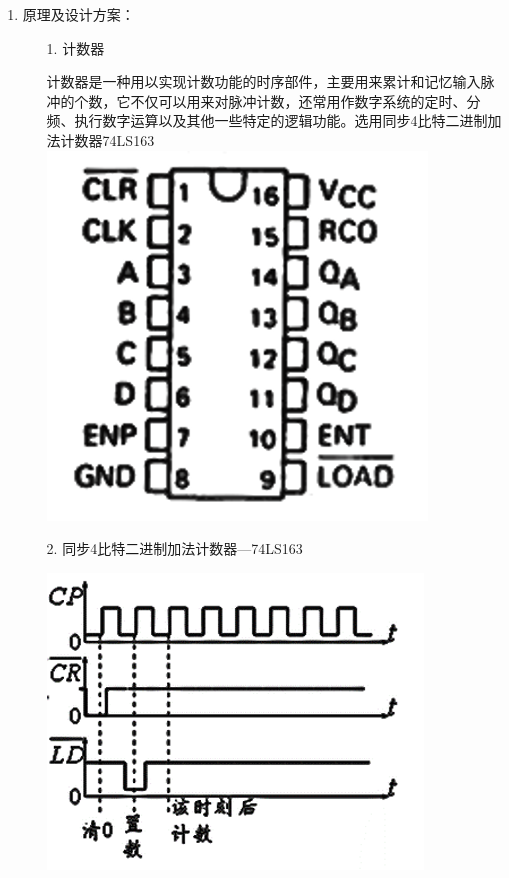 \documentclass[UTF8]{ctexart}
\begin{document}
\begin{enumerate}
    \large
    \vspace{1\baselineskip}
    \item 原理及设计方案：  \\
          \begin{itemize}
              \item [1.] 计数器                  \\
                    \begin{center}
                        计数器是一种用以实现计数功能的时序部件，主要用来累计和记忆输入脉冲的个数，它不仅可以用来对脉冲计数，还常用作数字系统的定时、分频、执行数字运算以及其他一些特定的逻辑功能。选用同步4比特二进制加法计数器74LS163
                        \includegraphics[scale=0.6]{1.png}
                    \end{center}

              \item [2.] 同步4比特二进制加法计数器—74LS163                  \\
                    \begin{center}
                        \includegraphics[scale = 0.6]{2.png}
                    \end{center}


\end{itemize}
\end{enumerate}
\end{document}
